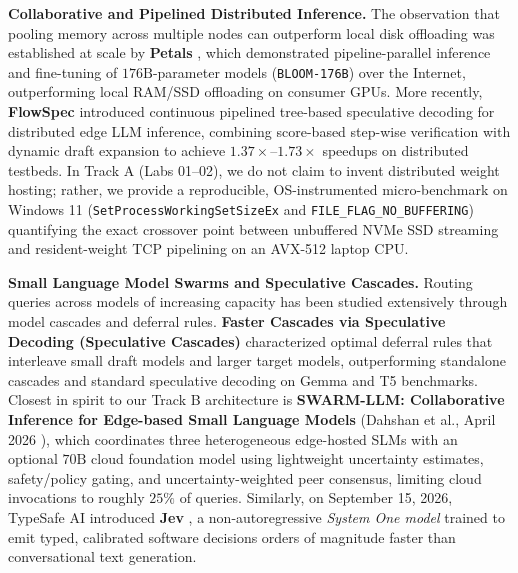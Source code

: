 \documentclass[10pt,a4paper]{article}
\begin{document}
\textbf{Collaborative and Pipelined Distributed Inference.}
The observation that pooling memory across multiple nodes can outperform local disk offloading was established at scale by \textbf{Petals} \cite{borzunov2023petals}, which demonstrated pipeline-parallel inference and fine-tuning of $176\text{B}$-parameter models (\texttt{BLOOM-176B}) over the Internet, outperforming local RAM/SSD offloading on consumer GPUs. More recently, \textbf{FlowSpec} \cite{liu2025flowspec} introduced continuous pipelined tree-based speculative decoding for distributed edge LLM inference, combining score-based step-wise verification with dynamic draft expansion to achieve $1.37\times\text{--}1.73\times$ speedups on distributed testbeds. In Track A (Labs 01--02), we do not claim to invent distributed weight hosting; rather, we provide a reproducible, OS-instrumented micro-benchmark on Windows 11 (\texttt{SetProcessWorkingSetSizeEx} and \texttt{FILE\_FLAG\_NO\_BUFFERING}) quantifying the exact crossover point between unbuffered NVMe SSD streaming and resident-weight TCP pipelining on an AVX-512 laptop CPU.

\textbf{Small Language Model Swarms and Speculative Cascades.}
Routing queries across models of increasing capacity has been studied extensively through model cascades and deferral rules. \textbf{Faster Cascades via Speculative Decoding (Speculative Cascades)} \cite{narasimhan2024cascades} characterized optimal deferral rules that interleave small draft models and larger target models, outperforming standalone cascades and standard speculative decoding on Gemma and T5 benchmarks. Closest in spirit to our Track B architecture is \textbf{SWARM-LLM: Collaborative Inference for Edge-based Small Language Models} (Dahshan et al., April 2026 \cite{dahshan2026swarmllm}), which coordinates three heterogeneous edge-hosted SLMs with an optional $70\text{B}$ cloud foundation model using lightweight uncertainty estimates, safety/policy gating, and uncertainty-weighted peer consensus, limiting cloud invocations to roughly $25\%$ of queries. Similarly, on September 15, 2026, TypeSafe AI introduced \textbf{Jev} \cite{typesafe2026jev}, a non-autoregressive \emph{System One model} trained to emit typed, calibrated software decisions orders of magnitude faster than conversational text generation.
\end{document}
